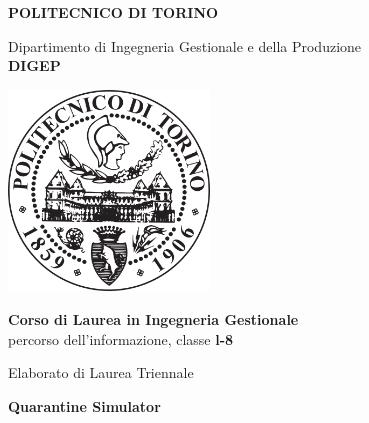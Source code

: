 \documentclass[a4paper, 12pt]{article}
\begin{document}

\begin{titlepage}
	\begin{center}
		\begin{huge}
			\textbf{POLITECNICO DI TORINO}
			
		\end{huge}
		\vspace{0.4cm}
		\begin{large}
			Dipartimento di Ingegneria Gestionale e della Produzione\\
			\vspace{0.3cm}
			\textbf{DIGEP}\\
		\end{large}
		
		\vspace{1.3cm}		
		
		\includegraphics[width=0.4\textwidth]{IMG/PoliTO_logo.png}
		
		\vspace{1.3cm}
		
		\begin{Large}
		\textbf{Corso di Laurea in Ingegneria Gestionale}\\
		\vspace{0.3cm}
		percorso dell'informazione, classe \textbf{l-8}
		\end{Large}
		
		\vspace{1cm}
		
		\begin{Large}
			Elaborato di Laurea Triennale\\
		\end{Large}
		
		\vspace{0.5cm}
		
		\begin{LARGE}
			\textbf{Quarantine Simulator}\\
		\end{LARGE}
	

\end{center}
\end{titlepage}
\end{document}
